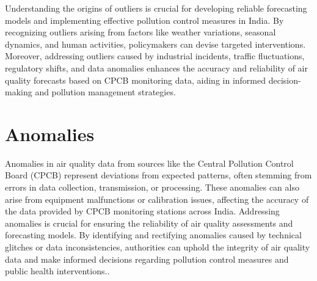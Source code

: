  \bigskip

Understanding the origins of outliers is crucial for developing reliable forecasting models and implementing effective pollution control measures in India. By recognizing outliers arising from factors like weather variations, seasonal dynamics, and human activities, policymakers can devise targeted interventions. Moreover, addressing outliers caused by industrial incidents, traffic fluctuations, regulatory shifts, and data anomalies enhances the accuracy and reliability of air quality forecasts based on CPCB monitoring data, aiding in informed decision-making and pollution management strategies.

\section{Anomalies}

Anomalies in air quality data from sources like the Central Pollution Control Board (CPCB) represent deviations from expected patterns, often stemming from errors in data collection, transmission, or processing. These anomalies can also arise from equipment malfunctions or calibration issues, affecting the accuracy of the data provided by CPCB monitoring stations across India. Addressing anomalies is crucial for ensuring the reliability of air quality assessments and forecasting models. By identifying and rectifying anomalies caused by technical glitches or data inconsistencies, authorities can uphold the integrity of air quality data and make informed decisions regarding pollution control measures and public health interventions.\cite{Smith:2019}\cite{CPCB:2023}.
 
